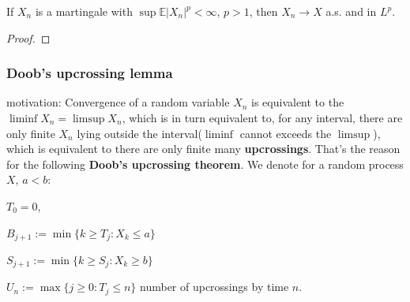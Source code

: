 \begin{theorem}
	If $X_n$ is a martingale with $\sup \mathbb{E}|X_n|^p < \infty$, $p > 1$, then $X_n \rightarrow X$ a.s. and in $L^p$.
\end{theorem}
\begin{proof}
	
\end{proof}



\subsubsection{Doob's upcrossing lemma}
motivation:
Convergence of a random variable $X_n$ is equivalent to the $\liminf X_n = \limsup X_n$, which is in turn equivalent to, for any interval, there are only finite $X_n$ lying outside the interval($\liminf$ cannot exceeds the $\limsup$), which is equivalent to there are only finite many \textbf{upcrossings}. That's the reason for the following \textbf{Doob's upcrossing theorem}. We denote for a random process $X$, $a < b$:\par 
$T_0 = 0$,\par
$B_{j + 1}:= \min\{k \geq T_j: X_k \leq a \}$\par 
$S_{j+1}:= \min\{ k \geq S_j: X_k \geq b\}$\par 
$U_n:= \max\{j \geq 0: T_j \leq n\}$ number of upcrossings by time $n$.

